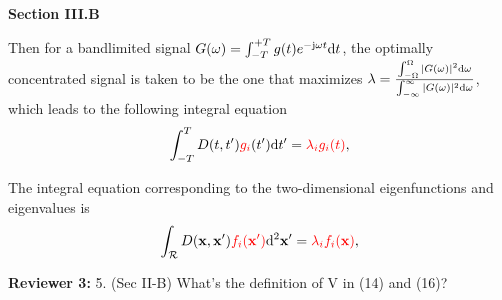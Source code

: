 \documentclass[a4paper,12pt]{article}
\begin{document}
\begin{framed}
{\bf Section III.B}

\setcounter{equation}{17}

Then for a bandlimited signal $G(\omega) = \int_{-T}^{+T}g(t)e^{-{\rm j}\omega t}{\rm d}t$, the optimally concentrated signal is taken to be the one that maximizes $\lambda = \frac{\int_{-\Omega}^{\Omega}|G(\omega)|^2{\rm d}\omega}{\int_{-\infty}^{\infty}|G(\omega)|^2{\rm d}\omega}$, which leads to the following integral equation
\begin{equation}
	\begin{aligned}
		\int_{-T}^{T}D(t,t'){\color{red}g_i}(t'){\rm d}t' = {\color{red}\lambda_{i} g_i(t)},
	\end{aligned}
	\label{eqn_1d_t}
\end{equation}

\setcounter{equation}{24}

The integral equation corresponding to the two-dimensional eigenfunctions and eigenvalues is 
\begin{equation}
	\begin{aligned}
		\int_{\mathcal{R}}D({\bf x},{\bf x}'){\color{red}f_i({\bf x}')}{\rm d}^2{\bf x}' = {\color{red}\lambda_i f_i({\bf x})},
	\end{aligned}
	\label{eqn_2d_integral}
\end{equation}
    
\end{framed}

\textbf{Reviewer 3:}
5. (Sec II-B) What’s the definition of V in (14) and (16)?

{}
\end{document}
